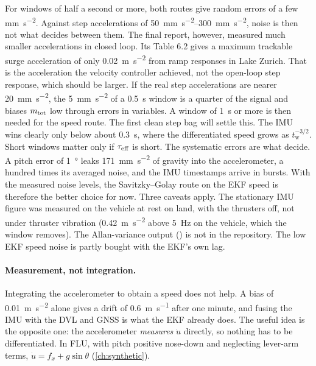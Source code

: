 For windows of half a second or more, both routes give random errors of a few
\unit{\milli\metre\per\second\squared}. Against step accelerations of
\qtyrange{50}{300}{\milli\metre\per\second\squared}, noise is then not what decides between them. The
final report, however, measured much smaller accelerations in closed loop. Its Table 6.2 gives a
maximum trackable surge acceleration of only \qty{0.02}{\metre\per\second\squared} from ramp
responses in Lake Zurich. That is the acceleration the velocity controller achieved, not the
open-loop step response, which should be larger. If the real step accelerations are nearer
\qty{20}{\milli\metre\per\second\squared}, the \qty{5}{\milli\metre\per\second\squared} of a
\qty{0.5}{\second} window is a quarter of the signal and biases $m_\mathrm{tot}$ low through errors in
variables. A window of \qty{1}{\second} or more is then needed for the speed route. The first clean
step bag will settle this. The IMU wins clearly only below about \qty{0.3}{\second}, where the
differentiated speed grows as $t_\mathrm{w}^{-3/2}$. Short windows matter only if $\tau_\mathrm{eff}$ is
short. The systematic errors are what decide. A pitch error of \qty{1}{\degree} leaks
\qty{171}{\milli\metre\per\second\squared} of gravity into the accelerometer, a hundred times its
averaged noise, and the IMU timestamps arrive in bursts. With the measured noise levels, the
Savitzky--Golay route on the EKF speed is therefore the better choice for now. Three caveats
apply. The stationary IMU figure was measured on the vehicle at rest on land, with the thrusters
off, not under thruster vibration (\qty{0.42}{\metre\per\second\squared} above \qty{5}{\hertz} on the vehicle, which the
window removes). The Allan-variance output () is not in the
repository. The low EKF speed noise is partly bought with the EKF's own lag.

\paragraph{Measurement, not integration.} Integrating the accelerometer to obtain a speed does
not help. A bias of \qty{0.01}{\meter\per\second\squared} alone gives a drift of
\qty{0.6}{\meter\per\second} after one minute, and fusing the IMU with the DVL and GNSS is what
the EKF already does. The useful idea is the opposite one: the accelerometer \emph{measures}
$\dot u$ directly, so nothing has to be differentiated. In FLU, with pitch positive nose-down
and neglecting lever-arm terms, $\dot u = f_x + g\sin\theta$ (\cref{ch:synthetic}).

